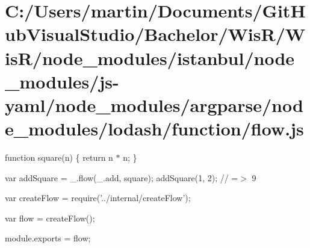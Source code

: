 \hypertarget{_c_1_2_users_2martin_2_documents_2_git_hub_visual_studio_2_bachelor_2_wis_r_2_wis_r_2node_modulea775a0da32206c2ef513bf59c23b5306}{}\section{C\+:/\+Users/martin/\+Documents/\+Git\+Hub\+Visual\+Studio/\+Bachelor/\+Wis\+R/\+Wis\+R/node\+\_\+modules/istanbul/node\+\_\+modules/js-\/yaml/node\+\_\+modules/argparse/node\+\_\+modules/lodash/function/flow.\+js}
function square(n) \{ return n $\ast$ n; \}

var add\+Square = \+\_\+.\+flow(\+\_\+.\+add, square); add\+Square(1, 2); // =$>$ 9


\begin{DoxyCodeInclude}
var createFlow = require(\textcolor{stringliteral}{'../internal/createFlow'});

var flow = createFlow();

module.exports = flow;
\end{DoxyCodeInclude}
 